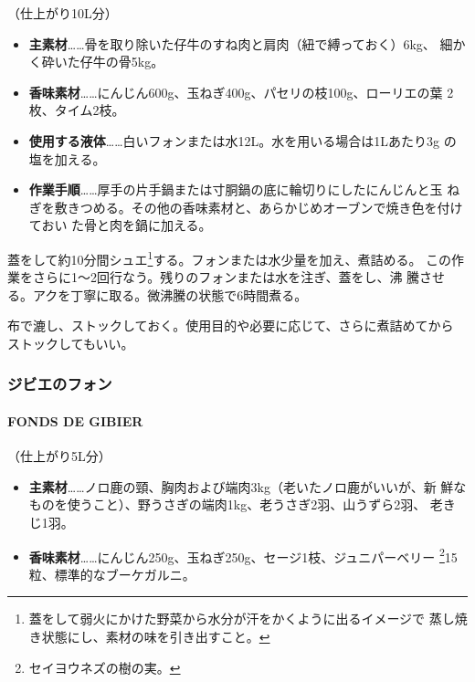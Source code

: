 \documentclass[twoside,12Q,b5j]{escoffierltjsbook}
\newenvironment{recette}{\begin{small}\begin{spacing}{1}\begin{multicols}{2}}{\end{multicols}\end{spacing}\end{small}}
\begin{document}
\begin{recette}
（仕上がり10L分）

\begin{itemize}
\item
  \textbf{主素材}\ldots{}\ldots{}骨を取り除いた仔牛のすね肉と肩肉（紐で縛っておく）6kg、
  細かく砕いた仔牛の骨5kg。
\item
  \textbf{香味素材}\ldots{}\ldots{}にんじん600g、玉ねぎ400g、パセリの枝100g、ローリエの葉
  2枚、タイム2枝。
\item
  \textbf{使用する液体}\ldots{}\ldots{}白いフォンまたは水12L。水を用いる場合は1Lあたり3g
  の塩を加える。
\item
  \textbf{作業手順}\ldots{}\ldots{}厚手の片手鍋または寸胴鍋の底に輪切りにしたにんじんと玉
  ねぎを敷きつめる。その他の香味素材と、あらかじめオーブンで焼き色を付けておい
  た骨と肉を鍋に加える。
\end{itemize}

蓋をして約10分間シュエ\footnote{蓋をして弱火にかけた野菜から水分が汗をかくように出るイメージで
  蒸し焼き状態にし、素材の味を引き出すこと。}する。フォンまたは水少量を加え、煮詰める。
この作業をさらに1〜2回行なう。残りのフォンまたは水を注ぎ、蓋をし、沸
騰させる。アクを丁寧に取る。微沸騰の状態で6時間煮る。

布で漉し、ストックしておく。使用目的や必要に応じて、さらに煮詰めてから
ストックしてもいい。

\vspace*{1.7\zw}

\subsubsection{ジビエのフォン}\label{ux30b8ux30d3ux30a8ux306eux30d5ux30a9ux30f3}

\paragraph{FONDS DE GIBIER}\label{fonds-de-gibier}


（仕上がり5L分）

\begin{itemize}
\item
  \textbf{主素材}\ldots{}\ldots{}ノロ鹿の頸、胸肉および端肉3kg（老いたノロ鹿がいいが、新
  鮮なものを使うこと）、野うさぎの端肉1kg、老うさぎ2羽、山うずら2羽、
  老きじ1羽。
\item
  \textbf{香味素材}\ldots{}\ldots{}にんじん250g、玉ねぎ250g、セージ1枝、ジュニパーベリー
  \footnote{セイヨウネズの樹の実。}15粒、標準的なブーケガルニ。
\end{itemize}


\end{recette}
\end{document}
